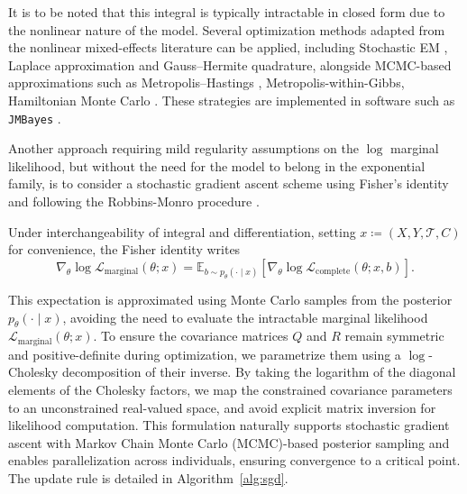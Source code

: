 \documentclass{sn-jnl}
\begin{document}
It is to be noted that this integral is typically intractable in closed form due to the nonlinear nature of the model. Several optimization methods adapted from the nonlinear mixed-effects literature can be applied, including Stochastic EM \citep{kuhn2004coupling}, Laplace approximation \citep{wolfinger1993laplace} and Gauss--Hermite quadrature, alongside MCMC-based approximations such as Metropolis--Hastings \citep{hastings1970monte}, Metropolis-within-Gibbs, Hamiltonian Monte Carlo \citep{neal2011mcmc}. These strategies are implemented in software such as \texttt{JMBayes} \citep{jmbayes22024,rizopoulos2020package}.

\bigbreak

Another approach requiring mild regularity assumptions on the $\log$ marginal likelihood, but without the need for the model to belong in the exponential family, is to consider a stochastic gradient ascent scheme \citep{caillebotte2025estimation, baey2023efficient} using Fisher's identity and following the Robbins-Monro procedure \citep{robbins1951stochastic}.

Under interchangeability of integral and differentiation, setting $x \coloneqq (X, Y, \mathcal{T}, C)$ for convenience, the Fisher identity writes
\[
    \nabla_\theta \log \mathcal{L}_\mathrm{marginal}(\theta; x) = \mathbb{E}_{b \sim p_\theta(\cdot \mid x)} \left[ \nabla_\theta \log \mathcal{L}_{\mathrm{complete}}(\theta; x, b) \right].
\]

This expectation is approximated using Monte Carlo samples from the posterior $p_\theta(\cdot \mid x)$, avoiding the need to evaluate the intractable marginal likelihood $\mathcal{L}_\mathrm{marginal}(\theta; x)$. To ensure the covariance matrices $Q$ and $R$ remain symmetric and positive-definite during optimization, we parametrize them using a $\log$-Cholesky decomposition of their inverse. By taking the logarithm of the diagonal elements of the Cholesky factors, we map the constrained covariance parameters to an unconstrained real-valued space, and avoid explicit matrix inversion for likelihood computation. This formulation naturally supports stochastic gradient ascent with Markov Chain Monte Carlo (MCMC)-based posterior sampling and enables parallelization across individuals, ensuring convergence to a critical point. The update rule is detailed in Algorithm~\ref{alg:sgd}.
\end{document}
